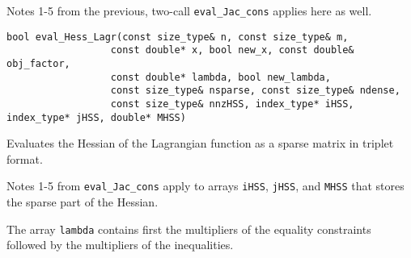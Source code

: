  Notes 1-5 from the previous, two-call \texttt{eval\_Jac\_cons} applies here as well.



\begin{lstlisting} 
bool eval_Hess_Lagr(const size_type& n, const size_type& m, 
			      const double* x, bool new_x, const double& obj_factor,
			      const double* lambda, bool new_lambda,
			      const size_type& nsparse, const size_type& ndense, 
			      const size_type& nnzHSS, index_type* iHSS, index_type* jHSS, double* MHSS)
\end{lstlisting} 

\noindent Evaluates the Hessian of the Lagrangian function as a sparse matrix in triplet format. 

 
 
 Notes 1-5 from \texttt{eval\_Jac\_cons} apply to arrays \texttt{iHSS}, \texttt{jHSS}, and \texttt{MHSS} that stores the sparse part of the Hessian.

 The array \texttt{lambda} contains first the multipliers of the equality constraints followed by the multipliers of the inequalities.


